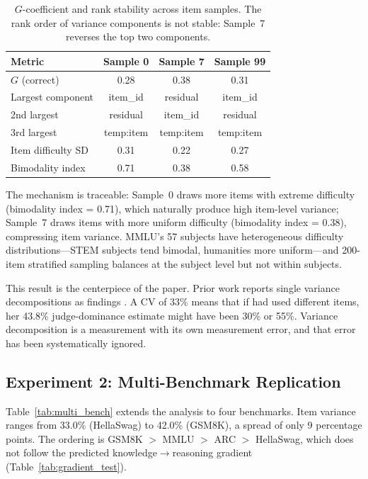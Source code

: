\documentclass[11pt]{article}
\begin{document}
\begin{table}[t]
\centering
\caption{$G$-coefficient and rank stability across item samples. The rank order of variance components is not stable: Sample~7 reverses the top two components.}
\label{tab:resample_stability}
\begin{tabular}{lccc}
\toprule
Metric & Sample 0 & Sample 7 & Sample 99 \\
\midrule
$G$ (correct)       & 0.28     & 0.38     & 0.31 \\
Largest component    & item\_id & residual & item\_id \\
2nd largest          & residual & item\_id & residual \\
3rd largest          & temp:item& temp:item& temp:item \\
Item difficulty SD   & 0.31     & 0.22     & 0.27 \\
Bimodality index     & 0.71     & 0.38     & 0.58 \\
\bottomrule
\end{tabular}
\end{table}

The mechanism is traceable: Sample~0 draws more items with extreme difficulty (bimodality index = 0.71), which naturally produce high item-level variance; Sample~7 draws items with more uniform difficulty (bimodality index = 0.38), compressing item variance.
MMLU's 57 subjects have heterogeneous difficulty distributions---STEM subjects tend bimodal, humanities more uniform---and 200-item stratified sampling balances at the subject level but not within subjects.

This result is the centerpiece of the paper.
Prior work reports single variance decompositions as findings \citep{mesting2026generalizability, brittlebench2026, bouthillier2021accounting}.
A CV of 33\% means that if \citet{mesting2026generalizability} had used different items, her 43.8\% judge-dominance estimate might have been 30\% or 55\%.
Variance decomposition is a measurement with its own measurement error, and that error has been systematically ignored.

\subsection{Experiment 2: Multi-Benchmark Replication}
\label{sec:exp2}

Table~\ref{tab:multi_bench} extends the analysis to four benchmarks.
Item variance ranges from 33.0\% (HellaSwag) to 42.0\% (GSM8K), a spread of only 9 percentage points.
The ordering is GSM8K $>$ MMLU $>$ ARC $>$ HellaSwag, which does not follow the predicted knowledge$\to$reasoning gradient (Table~\ref{tab:gradient_test}).
\end{document}
